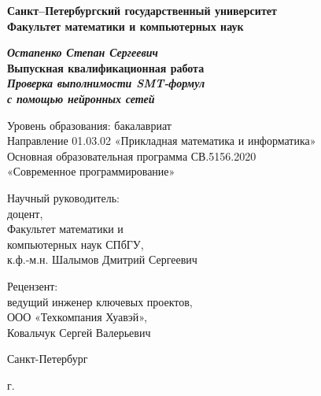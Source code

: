 \begin{titlepage}
\begin{center}

\textbf{Санкт--Петербургский государственный университет}\\
\textbf{Факультет математики и компьютерных наук}


\vspace{35mm}

\textbf{\textit{\large Остапенко Степан Сергеевич}} \\[8mm]
\textbf{\large Выпускная квалификационная работа}\\[3mm]
\textbf{\textit{\large Проверка выполнимости SMT-формул\\с помощью нейронных сетей}}

\vspace{20mm}
Уровень образования: бакалавриат\\
Направление 01.03.02 «Прикладная математика и информатика»\\
Основная образовательная программа СВ.5156.2020\\
«Современное программирование»\\[15mm]

\begin{flushright}
\begin{minipage}[t]{0.55\textwidth}
{Научный руководитель:} \\
доцент, \\
Факультет математики и \\
компьютерных наук СПбГУ, \\
к.ф.-м.н. Шалымов Дмитрий Сергеевич

\vspace{10mm}

{Рецензент:} \\
ведущий инженер ключевых проектов, \\
ООО «Техкомпания Хуавэй», \\
Ковальчук Сергей Валерьевич
\end{minipage}
\end{flushright}

\vspace{8mm}

{Санкт-Петербург}
\par{\the\year{} г.}
\end{center}
\end{titlepage}
\restoregeometry
\addtocounter{page}{1}

